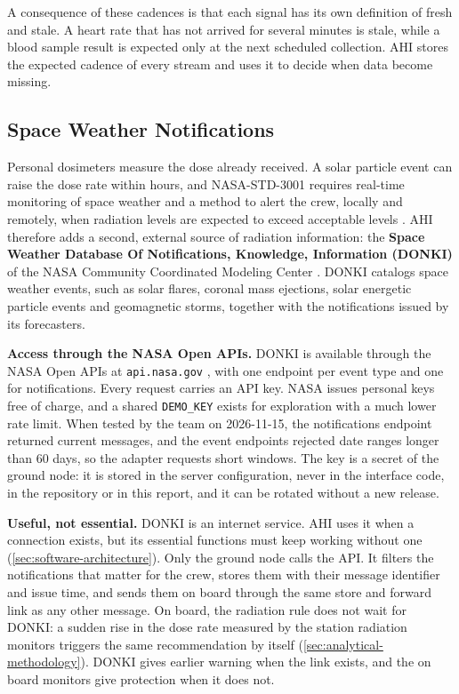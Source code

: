 A consequence of these cadences is that each signal has its own definition of fresh and stale. A heart rate that has not arrived for several minutes is stale, while a blood sample result is expected only at the next scheduled collection. AHI stores the expected cadence of every stream and uses it to decide when data become missing.

\subsection{Space Weather Notifications}
\label{subsec:space-weather}

Personal dosimeters measure the dose already received. A solar particle event can raise the dose rate within hours, and NASA-STD-3001 requires real-time monitoring of space weather and a method to alert the crew, locally and remotely, when radiation levels are expected to exceed acceptable levels \cite{nasa_ochmo_tb020_radiation}. AHI therefore adds a second, external source of radiation information: the \textbf{Space Weather Database Of Notifications, Knowledge, Information (DONKI)} of the NASA Community Coordinated Modeling Center \cite{nasa_donki}. DONKI catalogs space weather events, such as solar flares, coronal mass ejections, solar energetic particle events and geomagnetic storms, together with the notifications issued by its forecasters.

\medskip\noindent\textbf{Access through the NASA Open APIs.} DONKI is available through the NASA Open APIs at \texttt{api.nasa.gov} \cite{nasa_open_apis}, with one endpoint per event type and one for notifications. Every request carries an API key. NASA issues personal keys free of charge, and a shared \texttt{DEMO\_KEY} exists for exploration with a much lower rate limit. When tested by the team on 2026-11-15, the notifications endpoint returned current messages, and the event endpoints rejected date ranges longer than 60 days, so the adapter requests short windows. The key is a secret of the ground node: it is stored in the server configuration, never in the interface code, in the repository or in this report, and it can be rotated without a new release.

\medskip\noindent\textbf{Useful, not essential.} DONKI is an internet service. AHI uses it when a connection exists, but its essential functions must keep working without one (\ref{sec:software-architecture}). Only the ground node calls the API. It filters the notifications that matter for the crew, stores them with their message identifier and issue time, and sends them on board through the same store and forward link as any other message. On board, the radiation rule does not wait for DONKI: a sudden rise in the dose rate measured by the station radiation monitors triggers the same recommendation by itself (\ref{sec:analytical-methodology}). DONKI gives earlier warning when the link exists, and the on board monitors give protection when it does not.

